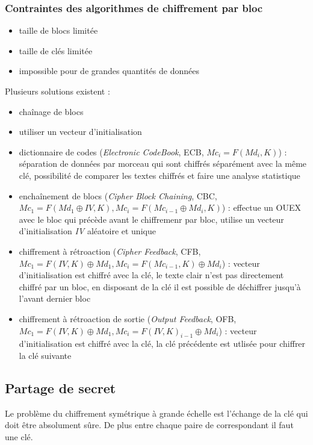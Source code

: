 \documentclass[12pt, a4paper]{article}
\begin{document}
	\subsubsection{Contraintes des algorithmes de chiffrement par bloc}
	\begin{itemize}
		\item taille de blocs limitée
		\item taille de clés limitée
		\item impossible pour de grandes quantités de données
	\end{itemize}
	Plusieurs solutions existent :
	\begin{itemize}
		\item chaînage de blocs
		\item utiliser un vecteur d'initialisation
		\item dictionnaire de codes (\textit{Electronic CodeBook}, ECB, \( Mc_{i} = F(Md_{i}, K) \)) : séparation de données par morceau qui sont chiffrés séparément avec la même clé, possibilité de comparer les textes chiffrés et faire une analyse statistique
		\item enchaînement de blocs (\textit{Cipher Block Chaining}, CBC, \( Mc_{1} = F(Md_{1} \oplus IV, K), Mc_{i} = F(Mc_{i-1} \oplus Md_{i}, K) \)) : effectue un OUEX avec le bloc qui précède avant le chiffremenr par bloc, utilise un vecteur d'initialisation \textit{IV} aléatoire et unique
		\item chiffrement à rétroaction (\textit{Cipher Feedback}, CFB, \( Mc_{1} = F(IV, K) \oplus Md_{1}, Mc_{i} = F(Mc_{i-1}, K) \oplus Md_{i} \)) : vecteur d'initialisation est chiffré avec la clé, le texte clair n'est pas directement chiffré par un bloc, en disposant de la clé il est possible de déchiffrer jusqu'à l'avant dernier bloc
		\item chiffrement à rétroaction de sortie (\textit{Output Feedback}, OFB, \( Mc_{1} = F(IV, K) \oplus Md_{1}, Mc_{i} = F(IV, K)_{i-1} \oplus Md_{i} \)) : vecteur d'initialisation est chiffré avec la clé, la clé précédente est utlisée pour chiffrer la clé suivante
	\end{itemize}
	\subsection{Partage de secret}
	Le problème du chiffrement symétrique à grande échelle est l'échange de la clé qui doit être absolument sûre. De plus entre chaque paire de correspondant il faut une clé.
\end{document}
